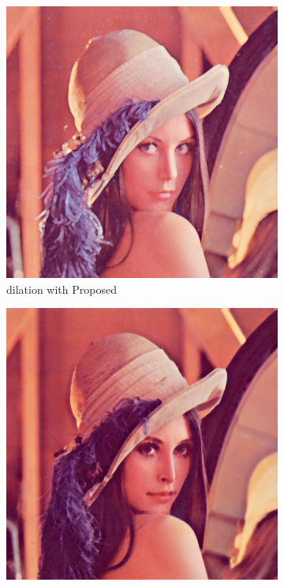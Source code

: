 \begin{figure}[!ht]
   \centering
\begin{subfigure}[t]{0.22\textwidth}
    \includegraphics[width=0.9\linewidth]{../project/images/outputs/compare_order/dilation_Proposed.png}
    \caption{dilation with Proposed}
    \centering
  \end{subfigure}
\begin{subfigure}[t]{0.22\textwidth}
    \includegraphics[width=0.9\linewidth]{../project/images/outputs/compare_order/erosion_Proposed.png}

\end{subfigure}
\end{figure}

